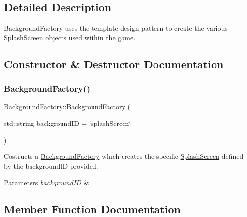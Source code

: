 \subsection{Detailed Description}
\hyperlink{class_background_factory}{Background\+Factory} uses the template design pattern to create the various \hyperlink{class_splash_screen}{Splash\+Screen} objects used within the game. 

\subsection{Constructor \& Destructor Documentation}
\mbox{\label{class_background_factory_acd0ab3d204fe6df9d2c32da4b8acc3fe}} 
\subsubsection{\texorpdfstring{Background\+Factory()}{BackgroundFactory()}}
{\footnotesize\ttfamily Background\+Factory\+::\+Background\+Factory (\begin{DoxyParamCaption}\item[{std\+::string}]{background\+ID = {\ttfamily \char`\"{}splashScreen\char`\"{}} }\end{DoxyParamCaption})\hspace{0.3cm}{\ttfamily [inline]}}



Costructs a \hyperlink{class_background_factory}{Background\+Factory} which creates the specific \hyperlink{class_splash_screen}{Splash\+Screen} defined by the background\+ID provided. 


\begin{DoxyParams}{Parameters}
{\em background\+ID} & \\
\hline
\end{DoxyParams}


\subsection{Member Function Documentation}
\mbox{\label{class_background_factory_a17793b3ec704137388b70f53361691c3}} 
